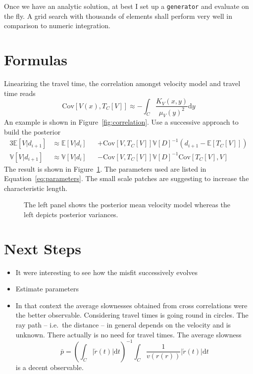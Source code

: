 \documentclass[11pt]{article}
\newcommand\Mean[1]{\mathbb{E}\!\left[#1\right]}
\newcommand\Var[1]{\mathbb{V}\!\left[#1\right]}
\newcommand\Cov[2]{\mathrm{Cov}\!\left[#1,#2\right]}
\begin{document}
Once we have an analytic solution, at best I set up a \texttt{generator} and evaluate on the fly.
A grid search with thousands of elements shall perform very well in comparison to numeric integration.



\section{Formulas}

Linearizing the travel time, the correlation amongst velocity model and travel time reads
\begin{equation}
    \Cov{V(x)}{T_C[V]} \approx -\int_C \frac{K_V(x,y)}{\mu_V(y)^2}  \mathrm d y
\end{equation}
An example is shown in Figure~\ref{fig:correlation}.
Use a successive approach to build the posterior
\begin{alignat}{3}
    \Mean{V|d_{i+1}} &\approx \Mean{V|d_i} &&+ \Cov{V}{T_C[V]}\Var{D}^{-1} \left(d_{i+1}-\Mean{T_C[V]}\right)
    \\
    \Var{V|d_{i+1}}  &\approx \Var{V|d_i}  &&- \Cov{V}{T_C[V]}\Var{D}^{-1}  \Cov{T_C[V]}{V}
\end{alignat}
The result is shown in Figure~\ref{fig:example}. The parameters used are listed in Equation~\ref{eq:parameters}.
The small scale patches are suggesting to increase the characteristic length.

\begin{figure}
    \centering
    
    \caption{The left panel shows the posterior mean velocity model whereas the left depicts posterior variances. }
    \label{fig:example}
\end{figure}


\section{Next Steps}

\begin{itemize}
    \item It were interesting to see how the misfit successively evolves
    \item Estimate parameters
    \item In that context the average slownesses obtained from cross correlations were the better observable.
        Considering travel times is going round in circles.
        The ray path -- i.e.~the distance -- in general depends on the velocity and is unknown.
        There actually is no need for travel times.
        The average slowness
        \begin{equation}
            \bar p = \left(\int_C |\acute r(t)| \mathrm d t \right)^{-1} \int_C \frac 1 {v(r(r))} |\acute r(t)| \mathrm d t
        \end{equation}
        is a decent observable.

\end{itemize}
\end{document}
